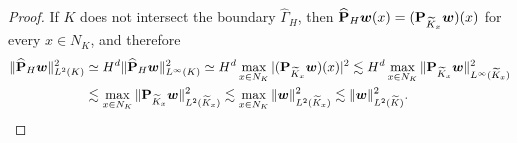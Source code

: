 \documentclass[10pt,a4paper]{amsart}
\newcommand{\bs}[1]{\boldsymbol{#1}}
\begin{document}
\begin{proof}
If $K$ does not intersect the boundary $\widehat\Gamma_H$, then 
$\widehat{\bf P}_H{\bs w}(x) = ({\bf P}_{\widetilde K_x}{\bs w})(x)$ for every $x\in N_K$, and therefore
\begin{align}\label{L2-wH-w}
\|\widehat{\bf P}_H{\bs w}\|_{L^2(K)}^2&
\simeq H^d\|\widehat{\bf P}_H{\bs w}\|_{L^\infty(K)}^2 
\simeq H^d\max_{x\in N_K}|({\bf P}_{\widetilde K_x}{\bs w})(x)|^2 
\lesssim H^d \max_{x\in N_K} \|{\bf P}_{\widetilde K_x}{\bs w}\|_{L^\infty(\widetilde K_x)}^2 \notag\\
&\lesssim \max_{x\in N_K} \|{\bf P}_{\widetilde K_x}{\bs w}\|_{L^2(\widetilde K_x)}^2 
\lesssim \max_{x\in N_K} \|{\bs w}\|_{L^2(\widetilde K_x)}^2  \lesssim \|{\bs w}\|_{L^2(\widetilde K)}^2 . 
\end{align}


\end{proof}
\end{document}
